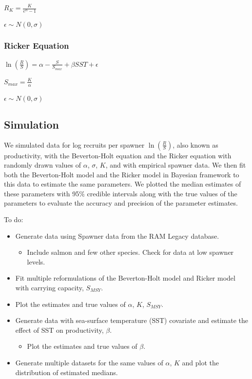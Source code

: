 \documentclass[10pt,letterpaper]{article}
\providecommand{\tightlist}{%
  \setlength{\itemsep}{0pt}\setlength{\parskip}{0pt}}
\begin{document}
\(R_K = \frac{K}{e^{\alpha}-1}\)

\(\epsilon \sim N(0,\sigma)\)

\subsubsection{Ricker Equation}\label{ricker-equation}

\(\ln(\frac{R}{S}) = \alpha - \frac{S}{S_{max}} + \beta SST + \epsilon\)

\(S_{max} = \frac{K}{\alpha}\)

\(\epsilon \sim N(0,\sigma)\)

\subsection{Simulation}\label{simulation}

We simulated data for log recruits per spawner \(\ln(\frac{R}{S})\),
also known as productivity, with the Beverton-Holt equation and the
Ricker equation with randomly drawn values of \(\alpha\), \(\sigma\),
\(K\), and with empirical spawner data. We then fit both the
Beverton-Holt model and the Ricker model in Bayesian framework to this
data to estimate the same parameters. We plotted the median estimates of
these parameters with 95\% credible intervals along with the true values
of the parameters to evaluate the accuracy and precision of the
parameter estimates.

To do:

\begin{itemize}
\tightlist
\item
  Generate data using Spawner data from the RAM Legacy database.

  \begin{itemize}
  \tightlist
  \item
    Include salmon and few other species. Check for data at low spawner
    levels.
  \end{itemize}
\item
  Fit multiple reformulations of the Beverton-Holt model and Ricker
  model with carrying capacity, \(S_{MSY}\).
\item
  Plot the estimates and true values of \(\alpha\), \(K\), \(S_{MSY}\).
\item
  Generate data with sea-surface temperature (SST) covariate and
  estimate the effect of SST on productivity, \(\beta\).

  \begin{itemize}
  \tightlist
  \item
    Plot the estimates and true values of \(\beta\).
  \end{itemize}
\item
  Generate multiple datasets for the same values of \(\alpha\), \(K\)
  and plot the distribution of estimated medians.
\end{itemize}
\end{document}
